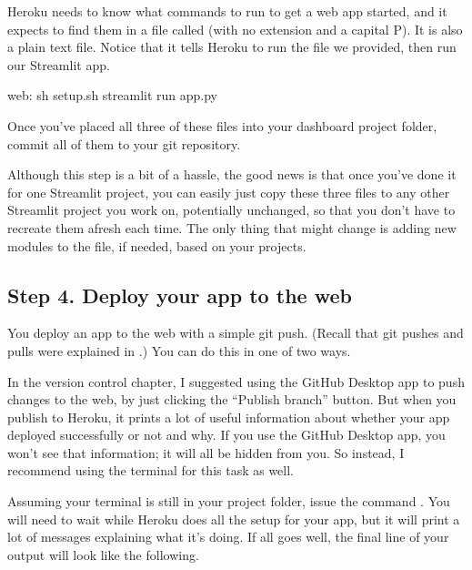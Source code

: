 \documentclass[letterpaper,10pt,english]{sphinxmanual}
\begin{document}
 Heroku needs to know what commands to run to get a web app started, and it expects to find them in a file called  (with no extension and a capital P).  It is also a plain text file.  Notice that it tells Heroku to run the  file we provided, then run our Streamlit app.

\begin{sphinxVerbatim}[commandchars=\\\{\}]
web: sh setup.sh  streamlit run app.py
\end{sphinxVerbatim}

Once you’ve placed all three of these files into your dashboard project folder, commit all of them to your git repository.

Although this step is a bit of a hassle, the good news is that once you’ve done it for one Streamlit project, you can easily just copy these three files to any other Streamlit project you work on, potentially unchanged, so that you don’t have to recreate them afresh each time.  The only thing that might change is adding new modules to the  file, if needed, based on your projects.


\subsection{Step 4. Deploy your app to the web}
\label{\detokenize{chapter-14-dashboards:step-4-deploy-your-app-to-the-web}}
You deploy an app to the web with a simple git push.  (Recall that git pushes and pulls were explained in .)  You can do this in one of two ways.

In the version control chapter, I suggested using the GitHub Desktop app to push changes to the web, by just clicking the “Publish branch” button.  But when you publish to Heroku, it prints a lot of useful information about whether your app deployed successfully or not and why.  If you use the GitHub Desktop app, you won’t see that information; it will all be hidden from you.  So instead, I recommend using the terminal for this task as well.

Assuming your terminal is still in your project folder, issue the command .  You will need to wait while Heroku does all the setup for your app, but it will print a lot of messages explaining what it’s doing.  If all goes well, the final line of your output will look like the following.
\end{document}
